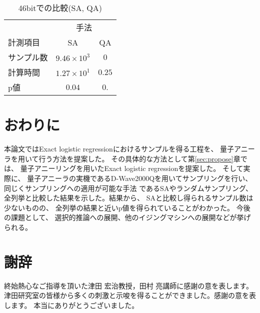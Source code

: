 \documentclass[12pt, dvipdfmx]{jmaster}
\theoremstyle{definition}
\begin{document}
\begin{table}[hbtp]
	\caption{46bitでの比較(SA, QA)}
	\label{tb:46bit_SA_QA}
	\centering
	\begin{tabular}{lcc}
		\hline
		& \multicolumn{2}{c}{手法}\\
		計測項目& SA& QA\\
		\hline\hline
		サンプル数& $9.46\times 10^{3}$ & $0$ \\
		\hline
		計算時間 & $1.27\times 10^{1}$ & $0.25$ \\
		\hline
		p値 & $0.04$ & $0.$ \\
		\hline
	\end{tabular}
\end{table}

\chapter{おわりに}
\label{sec:cncls}
本論文ではExact logistic regressionにおけるサンプルを得る工程を、
量子アニーラを用いて行う方法を提案した。
その具体的な方法として第\ref{sec:propose}章では、
量子アニーリングを用いたExact logistic regressionを提案した。
そして実際に、 量子アニーラの実機であるD-Wave2000Qを用いてサンプリングを行い、 同じくサンプリングへの適用が可能な手法
であるSAやランダムサンプリング、全列挙と比較した結果を示した。結果から、 SAと比較し得られるサンプル数は少ないものの、
全列挙の結果と近いp値を得られていることがわかった。
今後の課題として、 選択的推論への展開、他のイジングマシンへの展開などが挙げられる。

\chapter*{謝辞}
\label{sec:syazi}
終始熱心なご指導を頂いた津田 宏治教授，田村 亮講師に感謝の意を表します。
津田研究室の皆様から多くの刺激と示唆を得ることができました。感謝の意を表します。
本当にありがとうございました。





\end{document}
